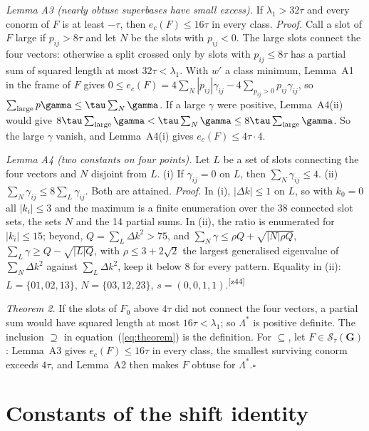 \documentclass[preprint,pdf]{iucr}          %
\newcommand{\Gmet}{\mathbf{G}}
\newcommand{\Sw}{\mathcal{S}_\tau}
\newcommand{\chk}[1]{\textsuperscript{[#1]}}
\begin{document}
\emph{Lemma A3 (nearly obtuse superbases have small excess).} If $\lambda_1>32\tau$ and every conorm of $F$ is at least $-\tau$, then $e_c(F)\le16\tau$ in every class. \emph{Proof.} Call a slot of $F$ large if $p_{ij}>8\tau$ and let $N$ be the slots with $p_{ij}<0$. The large slots connect the four vectors: otherwise a split crossed only by slots with $p_{ij}\le8\tau$ has a partial sum of squared length at most $32\tau<\lambda_1$. With $w'$ a class minimum, Lemma~A1 in the frame of $F$ gives $0\le e_c(F)=4\sum_N|p_{ij}|\gamma_{ij}-4\sum_{p_{ij}>0}p_{ij}\gamma_{ij}$, so $\sum_{\rm large}p\gamma\le\tau\sum_N\gamma$. If a large $\gamma$ were positive, Lemma~A4(ii) would give $8\tau\sum_{\rm large}\gamma<\tau\sum_N\gamma\le8\tau\sum_{\rm large}\gamma$. So the large $\gamma$ vanish, and Lemma~A4(i) gives $e_c(F)\le4\tau\cdot4$.

\emph{Lemma A4 (two constants on four points).} Let $L$ be a set of slots connecting the four vectors and $N$ disjoint from $L$. (i) If $\gamma_{ij}=0$ on $L$, then $\sum_N\gamma_{ij}\le4$. (ii) $\sum_N\gamma_{ij}\le8\sum_L\gamma_{ij}$. Both are attained. \emph{Proof.} In (i), $|\Delta k|\le1$ on $L$, so with $k_0=0$ all $|k_i|\le3$ and the maximum is a finite enumeration over the 38 connected slot sets, the sets $N$ and the 14 partial sums. In (ii), the ratio is enumerated for $|k_i|\le15$; beyond, $Q=\sum_L\Delta k^2>75$, and $\sum_N\gamma\le\rho Q+\sqrt{|N|\rho Q}$, $\sum_L\gamma\ge Q-\sqrt{|L|Q}$, with $\rho\le3+2\sqrt2$ the largest generalised eigenvalue of $\sum_N\Delta k^2$ against $\sum_L\Delta k^2$, keep it below $8$ for every pattern. Equality in (ii): $L=\{01,02,13\}$, $N=\{03,12,23\}$, $s=(0,0,1,1)$.\chk{z44}

\emph{Theorem 2.} If the slots of $F_0$ above $4\tau$ did not connect the four vectors, a partial sum would have squared length at most $16\tau<\lambda_1$; so $\Lambda^*$ is positive definite. The inclusion $\supseteq$ in equation~(\ref{eq:theorem}) is the definition. For $\subseteq$, let $F\in\Sw(\Gmet)$: Lemma~A3 gives $e_c(F)\le16\tau$ in every class, the smallest surviving conorm exceeds $4\tau$, and Lemma~A2 then makes $F$ obtuse for $\Lambda^*$.\hfill$\square$

\section{Constants of the shift identity}
\end{document}
